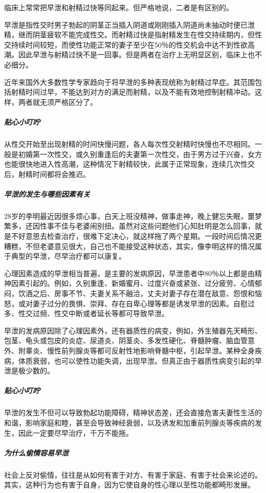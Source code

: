 临床上常常把早泄和射精过快等同起来。但严格地说，二者是有区别的。

早泄是指性交时男子勃起的阴茎正当插入阴道或刚刚插入阴道尚未抽动时便已泄精，继而阴茎疲软不能完成性交。而射精过快是指射精发生在性交持续期内，但性交持续时间较短，而使性功能正常的妻子至少在50％的性交机会中达不到性欲高潮。因此早泄与射精过快不是一回事。但是两者在治疗上无明显区别，临床上也不必细分。

近年来国外大多数性学专家趋向于将早泄的多种表现统称为射精过早症。其范围包括射精时间过早，不能达到对方的满足而射精，以及不能有效地控制射精冲动。这样，两者就无须严格区分了。

\subparagraph{贴心小叮咛}

从性交开始至出现射精的时间快慢问题，各人每次性交射精时快慢也不尽相同。一般是初婚第一次性交，或久别重逢后的夫妻第一次性交，由于男方过于兴奋，女方也能很快地进入性高潮，这种情况下射精较快，此属于正常现象，连续几次性交后，射精时间都将会推迟。

\subparagraph{早泄的发生与哪些因素有关}

28岁的李明最近因很多烦心事，白天上班没精神，做事走神，晚上健忘失眠，噩梦繁多，还因性事不佳与老婆闹别扭。虽然对这些问题他们心知肚明是怎么回事，就是不好意思去检查治疗，很难下定决心，就这样拖了两个星期。一段时间后情况更糟糕，不但老婆意见很大，自己也不能接受这种状态，其实，像李明这样的情况属于典型的早泄，尽早治疗都可以康复。

心理因素造成的早泄相当普遍，是主要的发病原因，早泄患者中80％以上都是由精神因素引起的。例如，久别重逢、新婚蜜月、过度兴奋或紧张、过分疲劳、心情郁闷，饮酒之后、房事不节、夫妻关系不融洽，丈夫对妻子存在潜在敌意、怨恨和恼怒，或对妻子过分的畏惧、崇拜、存在自卑心理等都是诱发早泄的因素。自慰过多、性交过频、性交中断或者延长等都可导致早泄。

早泄的发病原因除了心理因素外，还有器质性的病变，例如，外生殖器先天畸形、包茎、龟头或包皮的炎症、尿道炎、阴茎炎、多发性硬化、脊髓肿瘤、脑血管意外、附睾炎、慢性前列腺炎等都可反射性地影响脊髓中枢，引起早泄。某种全身疾病，体质衰弱，也可以使性功能失调，出现早泄。但真正由于器质性病变引起的早泄是极少数的。

\subparagraph{贴心小叮咛}

早泄的发生不但可以导致勃起功能障碍，精神状态差，还会直接危害夫妻性生活的和谐，影响家庭和睦，甚至会导致神经衰弱，以及诱发和加重前列腺炎等疾病的发生，因此一定要尽早治疗，千万不能拖。

\subparagraph{为什么偷情容易早泄}

社会上反对偷情，往往是从如何有害于对方、有害于家庭、有害于社会来论述的。其实，这种行为也有害于自身，因为它使自身的性心理以至性功能都畸形发展。

